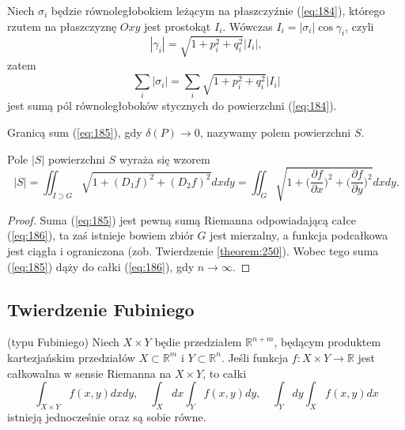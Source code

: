 \documentclass[leqno]{article}
\begin{document}
\begin{justify}
Niech $\sigma_i$ będzie równoległobokiem leżącym na płaszczyźnie (\ref{eq:184}), którego rzutem na płaszczyznę $Oxy$ jest prostokąt $I_i$. Wówczas 
$I_i = |\sigma_i| \cos \gamma_i$, czyli 
\[
    |\gamma_i| = \sqrt{1 + p_i^2 + q_i^2}|I_i|,
\]
zatem
\begin{equation}\label{eq:185}
    \sum_{i} |\sigma_i| = \sum_{i}\sqrt{1 + p_i^2 + q_i^2}|I_i|
\end{equation}
jest sumą pól równoległoboków stycznych do powierzchni (\ref{eq:184}).

\begin{defn}
    Granicą sum (\ref{eq:185}), gdy $\delta(P) \to 0$, nazywamy polem powierzchni $S$.
\end{defn}

\begin{theorem}
{
    Pole $|S|$ powierzchni $S$ wyraża się wzorem 
    \begin{equation}\label{eq:186}
        |S| = \iint_{I \supset G}\sqrt{1 + (D_1 f)^2 + (D_2 f)^2} dxdy = \iint_{G}\sqrt{1 + \Big(\frac{\partial f}{\partial x}\Big)^2 + \Big(\frac{\partial f}{\partial y}\Big)^2}dxdy.
    \end{equation}
}
\end{theorem}

\begin{proof}
    Suma (\ref{eq:185}) jest pewną sumą Riemanna odpowiadającą całce (\ref{eq:186}), ta zaś istnieje bowiem zbiór $G$ jest mierzalny,
    a funkcja podcałkowa jest ciągła i ograniczona (zob. Twierdzenie \ref{theorem:250}). 
    Wobec tego suma (\ref{eq:185}) dąży do całki (\ref{eq:186}), gdy $n \to \infty$.
\end{proof}

\subsection{Twierdzenie Fubiniego}

\begin{theorem}
{
    (typu Fubiniego) Niech $X \times Y$ będie przedziałem $\mathbb{R}^{n+m}$, będącym produktem kartezjańskim 
    przedziałów $X \subset \mathbb{R}^m$ i $Y \subset \mathbb{R}^n$. Jeśli funkcja $f : X \times Y \to \mathbb{R}$
    jest całkowalna w sensie Riemanna na $X \times Y$, to całki 
    \[
        \int_{X \times Y}f(x,y)dxdy, \quad \int_{X}dx\int_{Y}f(x,y)dy, \quad \int_{Y}dy\int_{X}f(x,y)dx
    \]
    istnieją jednocześnie oraz są sobie równe.
}
\end{theorem}


\end{justify}
\end{document}
